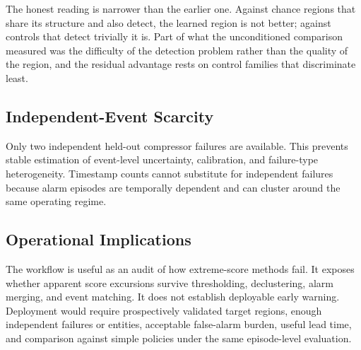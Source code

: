 The honest reading is narrower than the earlier one. Against chance regions that share its structure and also detect, the learned region is not better; against controls that detect trivially it is. Part of what the unconditioned comparison measured was the difficulty of the detection problem rather than the quality of the region, and the residual advantage rests on control families that discriminate least.

\subsection{Independent-Event Scarcity}

Only two independent held-out compressor failures are available. This prevents stable estimation of event-level uncertainty, calibration, and failure-type heterogeneity. Timestamp counts cannot substitute for independent failures because alarm episodes are temporally dependent and can cluster around the same operating regime.

\subsection{Operational Implications}

The workflow is useful as an audit of how extreme-score methods fail. It exposes whether apparent score excursions survive thresholding, declustering, alarm merging, and event matching. It does not establish deployable early warning. Deployment would require prospectively validated target regions, enough independent failures or entities, acceptable false-alarm burden, useful lead time, and comparison against simple policies under the same episode-level evaluation.
